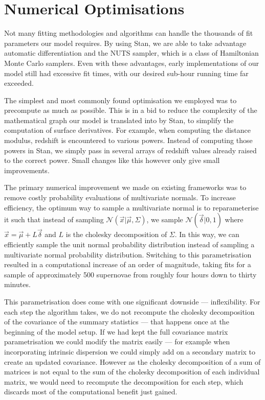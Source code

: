 \documentclass[twocolumn,trackchanges,tighten]{aastex62}
\begin{document}
\section{Numerical Optimisations}
\label{app:optimisations}


Not many fitting methodologies and algorithms can handle the thousands of fit parameters our model requires. By using Stan, we are able to take advantage automatic differentiation and the NUTS sampler, which is a class of Hamiltonian Monte Carlo samplers. Even with these advantages, early implementations of our model still had excessive fit times, with our desired sub-hour running time far exceeded. 

The simplest and most commonly found optimisation we employed was to precompute as much as possible. This is in a bid to reduce the complexity of the mathematical graph our model is translated into by Stan, to simplify the computation of surface derivatives. For example, when computing the distance modulus, redshift is encountered to various powers. Instead of computing those powers in Stan, we simply pass in several arrays of redshift values already raised to the correct power. Small changes like this however only give small improvements.

The primary numerical improvement we made on existing frameworks was to remove costly probability evaluations of multivariate normals. To increase efficiency, the optimum way to sample a multivariate normal is to reparameterise it such that instead of sampling $\mathcal{N}(\vec{x}|\vec{\mu}, \Sigma)$, we sample $\mathcal{N}(\vec{\delta}|0,1)$ where $\vec{x} = \vec{\mu} + L \vec{\delta}$ and $L$ is the cholesky decomposition of $\Sigma$. In this way, we can efficiently sample the unit normal probability distribution instead of sampling a multivariate normal probability distribution. Switching to this parametrisation resulted in a computational increase of an order of magnitude, taking fits for a sample of approximately 500 supernovae from roughly four hours down to thirty minutes. 

This parametrisation does come with one significant downside --- inflexibility. For each step the algorithm takes, we do not recompute the cholesky decomposition of the covariance of the summary statistics --- that happens once at the beginning of the model setup. If we had kept the full covariance matrix parametrisation we could modify the matrix easily --- for example when incorporating intrinsic dispersion we could simply add on a secondary matrix to create an updated covariance. However as the cholesky decomposition of a sum of matrices is not equal to the sum of the cholesky decomposition of each individual matrix, we would need to recompute the decomposition for each step, which discards most of the computational benefit just gained.
\end{document}
